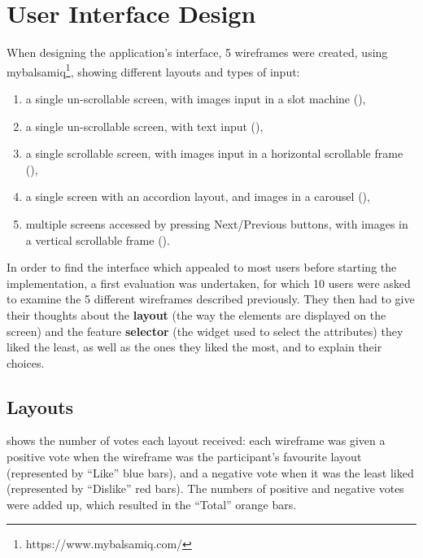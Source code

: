 \documentclass{mproj}
\begin{document}
\section{User Interface Design}\label{wireframes}

When designing the application's interface, 5 wireframes were created, using mybalsamiq\footnote{https://www.mybalsamiq.com/}, showing different layouts and types of input:
\begin{enumerate}[label=\Alph*.,topsep=0pt]
	\item a single un-scrollable screen, with images input in a slot machine (),
	\item a single un-scrollable screen, with text input (),
	\item a single scrollable screen, with images input in a horizontal scrollable frame (),
	\item a single screen with an accordion layout, and images in a carousel (),
	\item multiple screens accessed by pressing Next/Previous buttons, with images in a vertical scrollable frame ().
\end{enumerate}
	
In order to find the interface which appealed to most users before starting the implementation, a first evaluation was undertaken, for which 10 users were asked to examine the 5 different wireframes described previously. They then had to give their thoughts about the \textbf{layout} (the way the elements are displayed on the screen) and the feature \textbf{selector} (the widget used to select the attributes) they liked the least, as well as the ones they liked the most, and to explain their choices.

\subsection*{Layouts}

 shows the number of votes each layout received: each wireframe was given a positive vote when the wireframe was the participant's favourite layout (represented by ``Like'' blue bars), and a negative vote when it was the least liked (represented by ``Dislike'' red bars). The numbers of positive and negative votes were added up, which resulted in the ``Total'' orange bars. 
\end{document}
